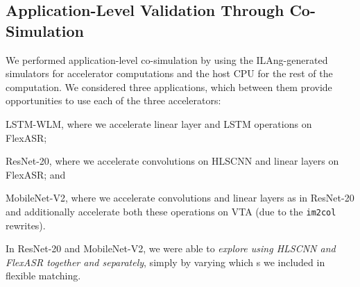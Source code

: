 \subsection{Application-Level Validation Through Co-Simulation}
\label{sec.end-to-end}

We  performed application-level co-simulation
  by using the
  ILAng-generated simulators for accelerator computations
  and the host CPU for the rest of the computation.
%
%
We considered three applications,
  which between them provide opportunities to use
  each of the three accelerators: %
\begin{inlinelist}
  \item LSTM-WLM, where we accelerate linear layer and LSTM operations on FlexASR;
  \item ResNet-20, where we accelerate convolutions on HLSCNN and linear layers on FlexASR; and
  \item MobileNet-V2, where we accelerate convolutions and linear layers as in ResNet-20 and additionally accelerate both these operations on VTA (due to the \texttt{im2col} rewrites).
\end{inlinelist}
In ResNet-20 and MobileNet-V2,
  we were able to
  \emph{explore using HLSCNN and FlexASR together and separately}, simply by varying which 
  {\mapping}s
  we included in flexible matching.


